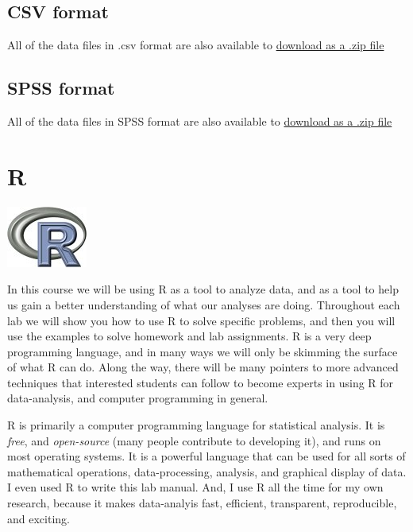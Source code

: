 \documentclass[
]{book}
\begin{document}
\hypertarget{csv-format}{%
\subsection{CSV format}\label{csv-format}}

All of the data files in .csv format are also available to \href{https://raw.githubusercontent.com/CrumpLab/statisticsLab/master/data/data_csv.zip}{download as a .zip file}

\hypertarget{spss-format}{%
\subsection{SPSS format}\label{spss-format}}

All of the data files in SPSS format are also available to \href{https://raw.githubusercontent.com/CrumpLab/statisticsLab/master/data/spssdata/spss_data.zip}{download as a .zip file}

\hypertarget{r}{%
\section{R}\label{r}}

\includegraphics{figures/rlogo.jpg}

In this course we will be using R as a tool to analyze data, and as a tool to help us gain a better understanding of what our analyses are doing. Throughout each lab we will show you how to use R to solve specific problems, and then you will use the examples to solve homework and lab assignments. R is a very deep programming language, and in many ways we will only be skimming the surface of what R can do. Along the way, there will be many pointers to more advanced techniques that interested students can follow to become experts in using R for data-analysis, and computer programming in general.

R is primarily a computer programming language for statistical analysis. It is \emph{free}, and \emph{open-source} (many people contribute to developing it), and runs on most operating systems. It is a powerful language that can be used for all sorts of mathematical operations, data-processing, analysis, and graphical display of data. I even used R to write this lab manual. And, I use R all the time for my own research, because it makes data-analyis fast, efficient, transparent, reproducible, and exciting.
\end{document}
